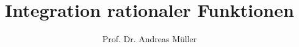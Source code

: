 %
%
%


\beamertemplatenavigationsymbolsempty
\title[RatInt]{Integration rationaler Funktionen}
\author[A.~Müller]{Prof. Dr. Andreas Müller}
\date[]{}

